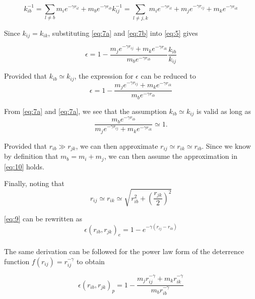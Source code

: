 \documentclass{article}
\begin{document}
\begin{subequations}
\begin{equation}\label{eq:7a}
k_{ib}^{-1} = \sum_{l \neq b}{m_i e^{-\gamma r_{il}}} + m_b e^{-\gamma r_{ib}}
\end{equation}
\begin{equation}\label{eq:7b}
k_{ij}^{-1} = \sum_{l \neq j, k}{m_i e^{-\gamma r_{il}}} + m_j e^{-\gamma r_{ij}} + m_k e^{-\gamma r_{ik}}
\end{equation}
\end{subequations}

Since $k_{ij} = k_{ik}$, substituting \eqref{eq:7a} and \eqref{eq:7b} into \eqref{eq:5} gives

\begin{equation}\label{eq:8}
\epsilon = 1 - \frac{ m_j e^{-\gamma r_{ij}} + m_k e^{-\gamma r_{ik}}}{m_b e^{-\gamma r_{ib}}} 
\frac{k_{ib}}{k_{ij}}
\end{equation}

Provided that $k_{ib} \simeq k_{ij}$, the expression for $\epsilon$ can be reduced to
\begin{equation}\label{eq:9}
\epsilon = 1 - \frac{m_j e^{-\gamma r_{ij}} + m_k e^{-\gamma r_{ik}}}{m_b e^{- \gamma r_{ib}}}
\end{equation}

From \eqref{eq:7a} and \eqref{eq:7a}, we see that the assumption  $k_{ib} \simeq k_{ij}$ is valid as long as 
\begin{equation}\label{eq:10}
\frac{m_b e^{- \gamma r_{ib}}}{m_j e^{-\gamma r_{ij}} + m_k e^{-\gamma r_{ik}}} \simeq 1.
\end{equation}

Provided that $r_{ib} \gg r_{jk}$, we can then approximate $r_{ij} \simeq r_{ik} \simeq r_{ib}$. Since we know by definition that $ m_b = m_i + m_j$, we can then assume the approximation in \eqref{eq:10} holds.
\\
\par Finally, noting that
\begin{equation}\label{eq:11}
r_{ij} \simeq r_{ik} \simeq \sqrt{r_{ib}^2 + \left(\frac{r_{jk}}{2}\right)^2}
\end{equation}

\eqref{eq:9} can be rewritten as
\begin{equation}\label{eq:12}
\epsilon \left( r_{ib}, r_{jk} \right)_{e} = 1 - e^{-\gamma \left( r_{ij} - r_{ib}\right)} 
\end{equation}
\\
The same derivation can be followed for the power law form of the deterrence function $f(r_{ij}) = r_{ij}^{-\gamma}$ to obtain 

\begin{equation}\label{eq:13}
\epsilon(r_{ib}, r_{jk})_{p} = 1 - \frac{m_j r_{ij}^{-\gamma} + m_k r_{ik}^{-\gamma}}{m_b r_{ib}^{-\gamma}}
\end{equation}
\end{document}
